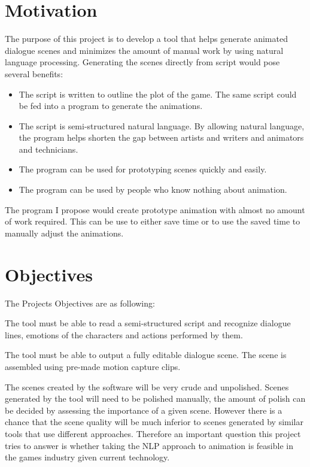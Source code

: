\section{Motivation}

The purpose of this project is to develop a tool that helps generate animated dialogue scenes and minimizes the amount of manual work by using natural language processing. Generating the scenes directly from script would pose several benefits:

\begin{itemize}
\item The script is written to outline the plot of the game. The same script could be fed into a program to generate the animations.
\item The script is semi-structured natural language. By allowing natural language, the program helps shorten the gap between artists and writers and animators and technicians.
\item The program can be used for prototyping scenes quickly and easily.
\item The program can be used by people who know nothing about animation.
\end{itemize}

The program I propose would create prototype animation with almost no amount of work required. This can be use to either save time or to use the saved time to manually adjust the animations.

\section{Objectives}

The Projects Objectives are as following:


\noindent The tool must be able to read a semi-structured script and recognize dialogue lines, emotions of the characters and actions performed by them.


\noindent The tool must be able to output a fully editable dialogue scene. The scene is assembled using pre-made motion capture clips.

\bigskip
The scenes created by the software will be very crude and unpolished. Scenes generated by the tool will need to be polished manually, the amount of polish can be decided by assessing the importance of a given scene. However there is a chance that the scene quality will be much inferior to scenes generated by similar tools that use different approaches. Therefore an important question this project tries to answer is whether taking the NLP approach to animation is feasible in the games industry given current technology.



